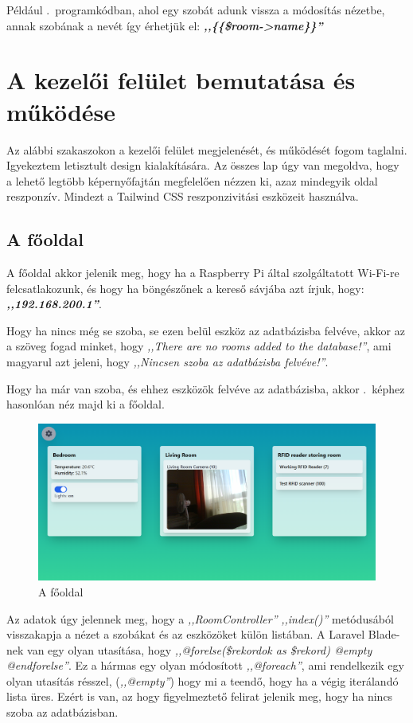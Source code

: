 \documentclass[
]{thesis-ekf}
\theoremstyle{definition}
\theoremstyle{remark}
\begin{document}
	Például .~programkódban, ahol egy szobát adunk vissza a módosítás nézetbe, annak szobának a nevét így érhetjük el: \emph{\textbf{,,\{\{\$room->name\}\}''}}
	
	\section{A kezelői felület bemutatása és működése}
	Az alábbi szakaszokon a kezelői felület megjelenését, és működését fogom taglalni. Igyekeztem letisztult design kialakítására. Az összes lap úgy van megoldva, hogy a lehető legtöbb képernyőfajtán megfelelően nézzen ki, azaz mindegyik oldal reszponzív. Mindezt a Tailwind CSS reszponzivitási eszközeit használva.\cite{tailwind-responsive}
	\subsection{A főoldal}
	A főoldal akkor jelenik meg, hogy ha a Raspberry Pi által szolgáltatott Wi-Fi-re felcsatlakozunk, és hogy ha böngészőnek a kereső sávjába azt írjuk, hogy:\\
	\textbf{\emph{,,192.168.200.1''}}.
	
	Hogy ha nincs még se szoba, se ezen belül eszköz az adatbázisba felvéve, akkor az a szöveg fogad minket, hogy \emph{,,There are no rooms added to the database!''}, ami magyarul azt jeleni, hogy \emph{,,Nincsen szoba az adatbázisba felvéve!''}.
	
	Hogy ha már van szoba, és ehhez eszközök felvéve az adatbázisba, akkor .~képhez hasonlóan néz majd ki a főoldal.
	\begin{figure}[ht!]
		\centering
		\includegraphics[width=1\textwidth]{./src/pages_img/index}
		\caption{A főoldal}
		\label{index-page}
	\end{figure}	

	Az adatok úgy jelennek meg, hogy a \emph{,,RoomController''} \emph{,,index()''} metódusából visszakapja a nézet a szobákat és az eszközöket külön listában. A Laravel Blade-nek van egy olyan utasítása, hogy \emph{,,@forelse(\$rekordok as \$rekord) @empty @endforelse''}. Ez a hármas egy olyan módosított \emph{,,@foreach''}, ami rendelkezik egy olyan utasítás résszel, (\emph{,,@empty''}) hogy mi a teendő, hogy ha a végig iterálandó lista üres.
	Ezért is van, az hogy figyelmeztető felirat jelenik meg, hogy ha nincs szoba az adatbázisban.
	
\end{document}

